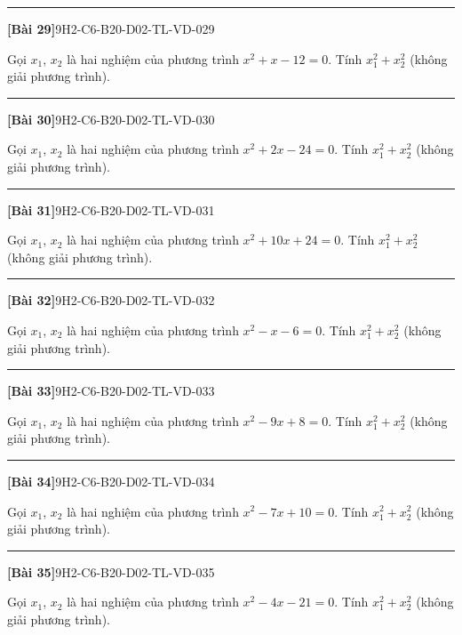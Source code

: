 \documentclass[12pt,a4paper]{article}
\newif\ifloigiai
\newenvironment{cauhoi}[2]{%
  \par\medskip\noindent\rule{\textwidth}{0.4pt}\par\nopagebreak
  \noindent\textbf{[#1]}\hfill{\scriptsize\ttfamily #2}\par\nopagebreak\smallskip}{\par}
\newcommand{\loigiai}[1]{\ifloigiai\par\smallskip\noindent\textit{Lời giải.} #1\par\fi}
\begin{document}
\begin{cauhoi}{Bài 29}{9H2-C6-B20-D02-TL-VD-029}
Gọi $x_1$, $x_2$ là hai nghiệm của phương trình $x^{2}+x-12=0$. Tính $x_1^{2}+x_2^{2}$ (không giải phương trình).
\loigiai{Theo định lí Viète: $x_1+x_2=-1$, $x_1x_2=-12$. Suy ra $x_1^{2}+x_2^{2}=(x_1+x_2)^{2}-2x_1x_2=-1^{2}-2\cdot(-12)=25$.}
\end{cauhoi}
\begin{cauhoi}{Bài 30}{9H2-C6-B20-D02-TL-VD-030}
Gọi $x_1$, $x_2$ là hai nghiệm của phương trình $x^{2}+2x-24=0$. Tính $x_1^{2}+x_2^{2}$ (không giải phương trình).
\loigiai{Theo định lí Viète: $x_1+x_2=-2$, $x_1x_2=-24$. Suy ra $x_1^{2}+x_2^{2}=(x_1+x_2)^{2}-2x_1x_2=-2^{2}-2\cdot(-24)=52$.}
\end{cauhoi}
\begin{cauhoi}{Bài 31}{9H2-C6-B20-D02-TL-VD-031}
Gọi $x_1$, $x_2$ là hai nghiệm của phương trình $x^{2}+10x+24=0$. Tính $x_1^{2}+x_2^{2}$ (không giải phương trình).
\loigiai{Theo định lí Viète: $x_1+x_2=-10$, $x_1x_2=24$. Suy ra $x_1^{2}+x_2^{2}=(x_1+x_2)^{2}-2x_1x_2=-10^{2}-2\cdot(24)=52$.}
\end{cauhoi}
\begin{cauhoi}{Bài 32}{9H2-C6-B20-D02-TL-VD-032}
Gọi $x_1$, $x_2$ là hai nghiệm của phương trình $x^{2}-x-6=0$. Tính $x_1^{2}+x_2^{2}$ (không giải phương trình).
\loigiai{Theo định lí Viète: $x_1+x_2=1$, $x_1x_2=-6$. Suy ra $x_1^{2}+x_2^{2}=(x_1+x_2)^{2}-2x_1x_2=1^{2}-2\cdot(-6)=13$.}
\end{cauhoi}
\begin{cauhoi}{Bài 33}{9H2-C6-B20-D02-TL-VD-033}
Gọi $x_1$, $x_2$ là hai nghiệm của phương trình $x^{2}-9x+8=0$. Tính $x_1^{2}+x_2^{2}$ (không giải phương trình).
\loigiai{Theo định lí Viète: $x_1+x_2=9$, $x_1x_2=8$. Suy ra $x_1^{2}+x_2^{2}=(x_1+x_2)^{2}-2x_1x_2=9^{2}-2\cdot(8)=65$.}
\end{cauhoi}
\begin{cauhoi}{Bài 34}{9H2-C6-B20-D02-TL-VD-034}
Gọi $x_1$, $x_2$ là hai nghiệm của phương trình $x^{2}-7x+10=0$. Tính $x_1^{2}+x_2^{2}$ (không giải phương trình).
\loigiai{Theo định lí Viète: $x_1+x_2=7$, $x_1x_2=10$. Suy ra $x_1^{2}+x_2^{2}=(x_1+x_2)^{2}-2x_1x_2=7^{2}-2\cdot(10)=29$.}
\end{cauhoi}
\begin{cauhoi}{Bài 35}{9H2-C6-B20-D02-TL-VD-035}
Gọi $x_1$, $x_2$ là hai nghiệm của phương trình $x^{2}-4x-21=0$. Tính $x_1^{2}+x_2^{2}$ (không giải phương trình).
\loigiai{Theo định lí Viète: $x_1+x_2=4$, $x_1x_2=-21$. Suy ra $x_1^{2}+x_2^{2}=(x_1+x_2)^{2}-2x_1x_2=4^{2}-2\cdot(-21)=58$.}
\end{cauhoi}
\end{document}
